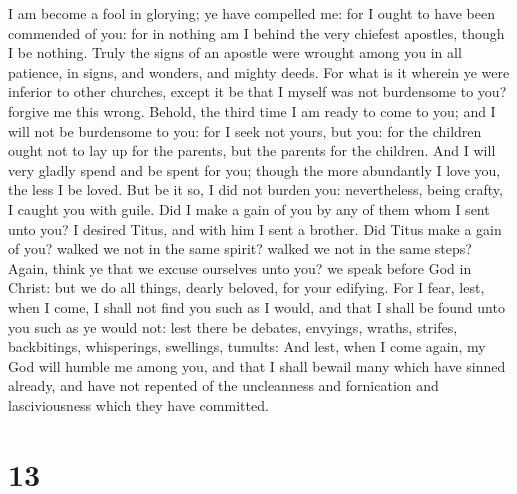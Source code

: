 I am become a fool in glorying; ye have compelled me:
for I ought to have been commended of you: for in nothing am I behind
the very chiefest apostles, though I be nothing.  Truly
the signs of an apostle were wrought among you in all patience, in
signs, and wonders, and mighty deeds.  For what is it
wherein ye were inferior to other churches, except it be that I myself
was not burdensome to you? forgive me this wrong. 
Behold, the third time I am ready to come to you; and I will not be
burdensome to you: for I seek not yours, but you: for the children ought
not to lay up for the parents, but the parents for the children.
 And I will very gladly spend and be spent for you;
though the more abundantly I love you, the less I be loved.
 But be it so, I did not burden you: nevertheless, being
crafty, I caught you with guile.  Did I make a gain of
you by any of them whom I sent unto you?  I desired
Titus, and with him I sent a brother. Did Titus make a gain of you?
walked we not in the same spirit? walked we not in the same steps?
 Again, think ye that we excuse ourselves unto you? we
speak before God in Christ: but we do all things, dearly beloved, for
your edifying.  For I fear, lest, when I come, I shall
not find you such as I would, and that I shall be found unto you such as
ye would not: lest there be debates, envyings, wraths, strifes,
backbitings, whisperings, swellings, tumults:  And lest,
when I come again, my God will humble me among you, and that I shall
bewail many which have sinned already, and have not repented of the
uncleanness and fornication and lasciviousness which they have
committed.

\hypertarget{section-12}{%
\section{13}\label{section-12}}

